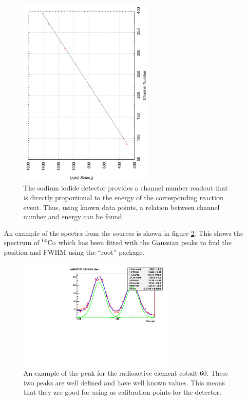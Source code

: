 \begin{figure}[ht]
	\centering
	\includegraphics[angle=270,width=0.6\textwidth]{calibration1NaI.pdf}
	\caption{The sodium iodide detector provides a channel number readout that is directly proportional to the energy of the corresponding reaction event. Thus, using known data points, a relation between channel number and energy can be found.\label{fig:naicalib}}
\end{figure}
An example of the spectra from the sources is shown in figure \ref{fig:cobaltcalib}. This shows the spectrum of $\ce{^{60}Co}$ which has been fitted with the Gaussian peaks to find the position and FWHM using the ``root'' package\cite{root}.

\begin{figure}[ht]
	\centering
	\includegraphics[width=0.7\textwidth]{calib20121113-60Co.pdf}
	\caption{An example of the peak for the radioactive element cobalt-60. These two peaks are well defined and have well known values. This means that they are good for using as calibration points for the detector.\label{fig:cobaltcalib}}
\end{figure}


